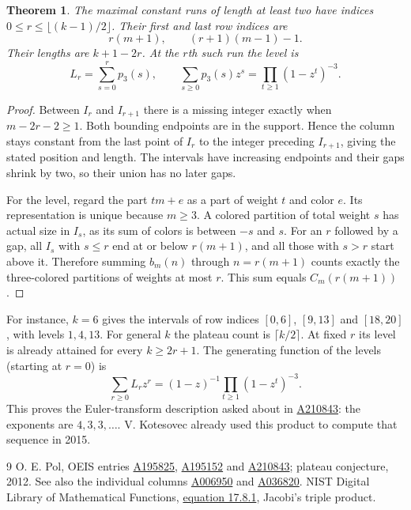 \documentclass[11pt,letterpaper]{article}
\newtheorem{theorem}{Theorem}
\newcommand{\oeis}[1]{\href{https://oeis.org/A#1}{A#1}}
\begin{document}
\begin{theorem}
The maximal constant runs of length at least two have indices
$0\le r\le\lfloor(k-1)/2\rfloor$. Their first and last row indices are
\[
                  r(m+1),\qquad (r+1)(m-1)-1.
\]
Their lengths are $k+1-2r$. At the $r$th such run the level is
\[
                 L_r=\sum_{s=0}^r p_3(s),\qquad
      \sum_{s\ge0}p_3(s)z^s=\prod_{t\ge1}(1-z^t)^{-3}.
\]
\end{theorem}
\begin{proof}
Between $I_r$ and $I_{r+1}$ there is a missing integer exactly when $m-2r-2\ge1$. Both bounding endpoints are in the support. Hence the column stays constant from the last point of $I_r$ to the integer preceding $I_{r+1}$, giving the stated position and length. The intervals have increasing endpoints and their gaps shrink by two, so their union has no later gaps.

For the level, regard the part $tm+e$ as a part of weight $t$ and color $e$. Its representation is unique because $m\ge3$. A colored partition of total weight $s$ has actual size in $I_s$, as its sum of colors is between $-s$ and $s$. For an $r$ followed by a gap, all $I_s$ with $s\le r$ end at or below $r(m+1)$, and all those with $s>r$ start above it. Therefore summing $b_m(n)$ through $n=r(m+1)$ counts exactly the three-colored partitions of weights at most $r$. This sum equals $C_m(r(m+1))$.
\end{proof}

For instance, $k=6$ gives the intervals of row indices $[0,6]$, $[9,13]$ and $[18,20]$, with levels $1,4,13$. For general $k$ the plateau count is $\lceil k/2\rceil$. At fixed $r$ its level is already attained for every $k\ge2r+1$. The generating function of the levels (starting at $r=0$) is
\[
     \sum_{r\ge0}L_rz^r
       =(1-z)^{-1}\prod_{t\ge1}(1-z^t)^{-3}.
\]
This proves the Euler-transform description asked about in \oeis{210843}: the exponents are $4,3,3,\ldots$. V. Kotesovec already used this product to compute that sequence in 2015.

\begin{thebibliography}{9}
 O. E. Pol, OEIS entries \oeis{195825}, \oeis{195152} and \oeis{210843}; plateau conjecture, 2012. See also the individual columns \oeis{006950} and \oeis{036820}.
 NIST Digital Library of Mathematical Functions, \href{https://dlmf.nist.gov/17.8.E1}{equation 17.8.1}, Jacobi's triple product.
\end{thebibliography}
\end{document}
